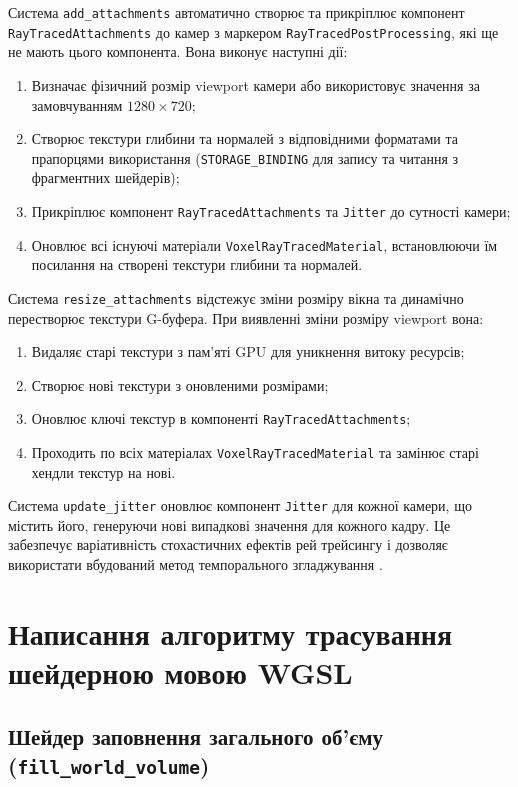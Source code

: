 Система \texttt{add\_attachments} автоматично створює та прикріплює компонент \texttt{RayTracedAttachments} до камер з маркером \texttt{RayTracedPostProcessing}, які ще не мають цього компонента. Вона виконує наступні дії:

\begin{enumerate}[itemsep=0pt, topsep=0pt]
    \item Визначає фізичний розмір viewport камери або використовує значення за замовчуванням $1280 \times 720$;
    \item Створює текстури глибини та нормалей з відповідними форматами та прапорцями використання (\texttt{STORAGE\_BINDING} для запису та читання з фрагментних шейдерів);
    \item Прикріплює компонент \texttt{RayTracedAttachments} та \texttt{Jitter} до сутності камери;
    \item Оновлює всі існуючі матеріали \texttt{VoxelRayTracedMaterial}, встановлюючи їм посилання на створені текстури глибини та нормалей.
\end{enumerate}

Система \texttt{resize\_attachments} відстежує зміни розміру вікна та динамічно перестворює текстури G-буфера. При виявленні зміни розміру viewport вона:

\begin{enumerate}[itemsep=0pt, topsep=0pt]
    \item Видаляє старі текстури з пам'яті GPU для уникнення витоку ресурсів;
    \item Створює нові текстури з оновленими розмірами;
    \item Оновлює ключі текстур в компоненті \texttt{RayTracedAttachments};
    \item Проходить по всіх матеріалах \texttt{VoxelRayTracedMaterial} та замінює старі хендли текстур на нові.
\end{enumerate}

Система \texttt{update\_jitter} оновлює компонент \texttt{Jitter} для кожної камери, що містить його, генеруючи нові випадкові значення для кожного кадру. Це забезпечує варіативність стохастичних ефектів рей трейсингу і дозволяє використати вбудований метод темпорального згладжування .

\section{Написання алгоритму трасування шейдерною мовою WGSL}
\subsection{Шейдер заповнення загального об'єму\\(\texttt{fill\_world\_volume})}

